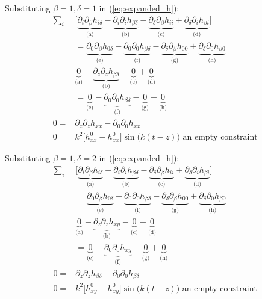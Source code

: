 \documentclass[]{article}
\begin{document}
Substituting $\beta=1,\delta=1$ in (\ref{eq:expanded_h}):
\begin{align*}
	\sum_i&\big[\underbrace{\partial_i\partial_\beta h_{i\delta}}_\text{(a)} - \underbrace{\partial_i\partial_i h_{\beta\delta}}_\text{(b)} -  \underbrace{\partial_\delta\partial_\beta h_{ii}}_\text{(c)} + \underbrace{\partial_\delta\partial_i h_{\beta i}}_\text{(d)}\big]\\
	&=\underbrace{\partial_0\partial_\beta h_{0\delta}}_\text{(e)} - \underbrace{\partial_0\partial_0 h_{\beta\delta}}_\text{(f)} -  \underbrace{\partial_\delta\partial_\beta h_{00}}_\text{(g)} + \underbrace{\partial_\delta\partial_0 h_{\beta 0}}_\text{(h)}\\
	&\underbrace{0}_\text{(a)} - \underbrace{\partial_z\partial_z h_{\beta\delta}}_\text{(b)} -  \underbrace{0}_\text{(c)} + \underbrace{0}_\text{(d)}\\
	&=\underbrace{0}_\text{(e)} - \underbrace{\partial_0\partial_0 h_{\beta\delta}}_\text{(f)} -  \underbrace{0}_\text{(g)} + \underbrace{0}_\text{(h)}\\
	0=&\partial_z\partial_z h_{xx}-\partial_0\partial_0 h_{xx}\\
	0=&k^2 \big[ h^0_{xx} - h^0_{xx}\big] \sin\big(k(t-z)\big) \text{ an empty constraint }
\end{align*}

Substituting $\beta=1,\delta=2$ in (\ref{eq:expanded_h}):
\begin{align*}
	\sum_i&\big[\underbrace{\partial_i\partial_\beta h_{i\delta}}_\text{(a)} - \underbrace{\partial_i\partial_i h_{\beta\delta}}_\text{(b)} -  \underbrace{\partial_\delta\partial_\beta h_{ii}}_\text{(c)} + \underbrace{\partial_\delta\partial_i h_{\beta i}}_\text{(d)}\big]\\
	&=\underbrace{\partial_0\partial_\beta h_{0\delta}}_\text{(e)} - \underbrace{\partial_0\partial_0 h_{\beta\delta}}_\text{(f)} -  \underbrace{\partial_\delta\partial_\beta h_{00}}_\text{(g)} + \underbrace{\partial_\delta\partial_0 h_{\beta 0}}_\text{(h)}\\
	&\underbrace{0}_\text{(a)} - \underbrace{\partial_z\partial_z h_{xy}}_\text{(b)} -  \underbrace{0}_\text{(c)} + \underbrace{0}_\text{(d)}\\
	&=\underbrace{0}_\text{(e)} - \underbrace{\partial_0\partial_0 h_{xy}}_\text{(f)} -  \underbrace{0}_\text{(g)} + \underbrace{0}_\text{(h)}\\
	0=& \partial_z\partial_z h_{\beta\delta} -\partial_0\partial_0 h_{\beta\delta}\\
	0=&k^2 \big[h^0_{xy}-h^0_{xy}\big] \sin\big(k(t-z)\big) \text{ an empty constraint }
\end{align*}
\end{document}
